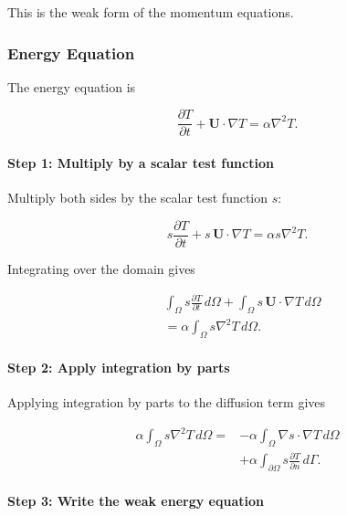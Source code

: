 \documentclass{article}
\begin{document}
This is the weak form of the momentum equations.

\subsubsection{Energy Equation}

The energy equation is

\begin{equation}
\frac{\partial T}{\partial t}
+\mathbf{U}\cdot\nabla T
=\alpha\nabla^2T.
\end{equation}

\paragraph{Step 1: Multiply by a scalar test function}

Multiply both sides by the scalar test function $s$:

\begin{equation}
s\frac{\partial T}{\partial t}
+s\,\mathbf{U}\cdot\nabla T
=\alpha s\nabla^2T.
\end{equation}

Integrating over the domain gives

\begin{equation}
\begin{aligned}
&\int_\Omega s\frac{\partial T}{\partial t}\,d\Omega
+\int_\Omega s\,\mathbf{U}\cdot\nabla T\,d\Omega\\
&=\alpha\int_\Omega s\nabla^2T\,d\Omega.
\end{aligned}
\end{equation}

\paragraph{Step 2: Apply integration by parts}

Applying integration by parts to the diffusion term gives

\begin{equation}
\begin{aligned}
\alpha\int_\Omega s\nabla^2T\,d\Omega
={}&-\alpha\int_\Omega
\nabla s\cdot\nabla T\,d\Omega\\
&+\alpha\int_{\partial\Omega}
s\frac{\partial T}{\partial n}\,d\Gamma.
\end{aligned}
\end{equation}

\paragraph{Step 3: Write the weak energy equation}
\end{document}
